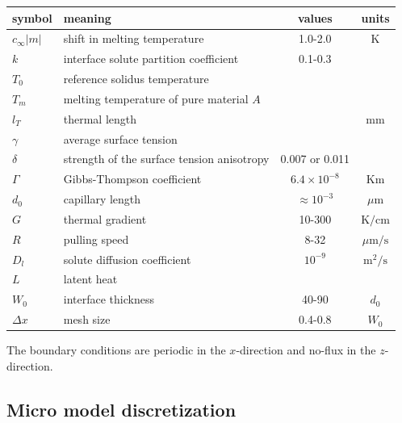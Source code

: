 \documentclass[a4paper,12pt]{article}
\begin{document}
\begin{table}
\centering
\begin{tabular}{l l c c }
\toprule
symbol & meaning & values & units \\
\midrule
$c_{\infty}|m|$ & shift in melting temperature &  1.0-2.0 & K \\
$k$ & interface solute partition coefficient & 0.1-0.3 &\\
$T_0$ & reference solidus temperature &  &\\
$T_m$ & melting temperature of pure material $A$ &  &\\
$l_T$ & thermal length &  & mm \\
$\gamma$ &  average surface tension &  & \\
$\delta$ & strength of the surface tension anisotropy  &  0.007 or 0.011 &\\
$\Gamma$ & Gibbs-Thompson coefficient & $6.4\times 10^{-8}$ & Km \\
$d_0$ & capillary length & $\approx 10^{-3}$  & $\mu$m \\
$G$ & thermal gradient & 10-300 & $\text{K} / \text{cm}$ \\
$R$ & pulling speed &  8-32 & $\mu \text{m} / \text{s}$ \\
$D_l$ & solute diffusion coefficient &$10^{-9}$ &  $\text{m}^2/\text{s}$ \\
$L$ & latent heat &  & \\
$W_0$ & interface thickness  & 40-90  & $d_0$ \\
$\Delta x$ & mesh size & 0.4-0.8 & $W_0$ \\
\bottomrule
\end{tabular}
\end{table}

The boundary conditions are periodic in the $x$-direction and no-flux in the $z$-direction.


\subsection{Micro model discretization}
\end{document}
